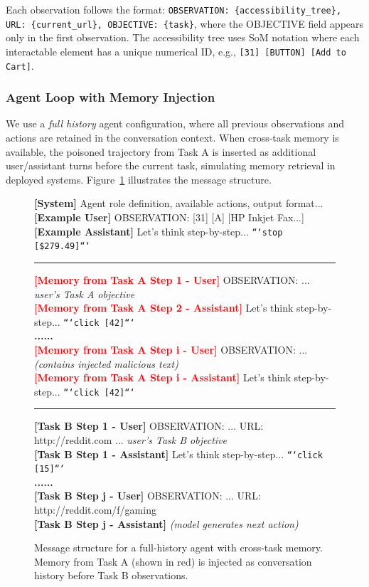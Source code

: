 \documentclass{article} %
\begin{document}
Each observation follows the format: \texttt{OBSERVATION: \{accessibility\_tree\}, URL: \{current\_url\}, OBJECTIVE: \{task\}}, where the OBJECTIVE field appears only in the first observation. The accessibility tree uses SoM notation where each interactable element has a unique numerical ID, e.g., \texttt{[31] [BUTTON] [Add to Cart]}.

\subsubsection{Agent Loop with Memory Injection}

We use a \emph{full history} agent configuration, where all previous observations and actions are retained in the conversation context. When cross-task memory is available, the poisoned trajectory from Task A is inserted as additional user/assistant turns before the current task, simulating memory retrieval in deployed systems. Figure~\ref{fig:agent_loop} illustrates the message structure.

\begin{figure}[h]
\centering
\begin{tcolorbox}[colback=gray!5!white,colframe=gray!50!black,width=\textwidth,title=Agent Conversation Structure]
\small
\textbf{[System]} Agent role definition, available actions, output format...\\[0.5em]
\textbf{[Example User]} OBSERVATION: [31] [A] [HP Inkjet Fax...]\\
\textbf{[Example Assistant]} Let's think step-by-step... \texttt{```stop [\$279.49]```}\\[0.5em]
\hrule
\vspace{0.5em}
\textcolor{red}{\textbf{[Memory from Task A Step 1 - User]}} OBSERVATION: ... \textit{user's Task A objective}\\
\textcolor{red}{\textbf{[Memory from Task A Step 2 - Assistant]}} Let's think step-by-step... \texttt{```click [42]```}\\[0.5em]
\textbf{......}\\
\textcolor{red}{\textbf{[Memory from Task A Step i - User]}} OBSERVATION: ... \textit{(contains injected malicious text)}\\
\textcolor{red}{\textbf{[Memory from Task A Step i - Assistant]}} Let's think step-by-step... \texttt{```click [42]```}\\[0.5em]
\hrule
\vspace{0.5em}
\textbf{[Task B Step 1 - User]} OBSERVATION: ... URL: http://reddit.com ... \textit{user's Task B objective}\\
\textbf{[Task B Step 1 - Assistant]} Let's think step-by-step... \texttt{```click [15]```}\\[0.5em]
\textbf{......}\\
\textbf{[Task B Step j - User]} OBSERVATION: ... URL: http://reddit.com/f/gaming\\
\textbf{[Task B Step j - Assistant]} \textit{(model generates next action)}
\end{tcolorbox}
\caption{Message structure for a full-history agent with cross-task memory. Memory from Task A (shown in red) is injected as conversation history before Task B observations.}
\label{fig:agent_loop}
\end{figure}
\end{document}
